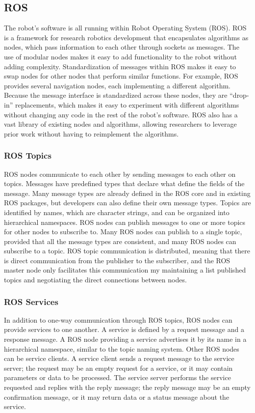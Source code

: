 \documentclass{cwru}
\begin{document}
\subsection{ROS}
The robot{\textquoteright}s software is all running within Robot Operating System (ROS). ROS is a framework for research robotics development that encapsulates algorithms as nodes, which pass information to each other through sockets as messages. The use of modular nodes makes it easy to add functionality to the robot without adding complexity. Standardization of messages within ROS makes it easy to swap nodes for other nodes that perform similar functions. For example, ROS provides several navigation nodes, each implementing a different algorithm. Because the message interface is standardized across these nodes, they are {\textquotedblleft}drop-in{\textquotedblright} replacements, which makes it easy to experiment with different algorithms without changing any code in the rest of the robot{\textquoteright}s software. ROS also has a vast library of existing nodes and algorithms, allowing researchers to leverage prior work without having to reimplement the algorithms.

\subsubsection[ROS Topics]{ROS Topics}
ROS nodes communicate to each other by sending messages to each other on topics. Messages have predefined types that declare what define the fields of the message. Many message types are already defined in the ROS core and in existing ROS packages, but developers can also define their own message types. Topics are identified by names, which are character strings, and can be organized into hierarchical namespaces. ROS nodes can publish messages to one or more topics for other nodes to subscribe to. Many ROS nodes can publish to a single topic, provided that all the message types are consistent, and many ROS nodes can subscribe to a topic. ROS topic communication is distributed, meaning that there is direct communication from the publisher to the subscriber, and the ROS master node only facilitates this communication my maintaining a list published topics and negotiating the direct connections between nodes.\cite{ros-pub-sub}

\subsubsection{ROS Services}
In addition to one-way communication through ROS topics, ROS nodes can provide services to one another. A service is defined by a request message and a response message. A ROS node providing a service advertises it by its name in a hierarchical namespace, similar to the topic naming system. Other ROS nodes can be service clients. A service client sends a request message to the service server; the request may be an empty request for a service, or it may contain parameters or data to be processed. The service server performs the service requested and replies with the reply message; the reply message may be an empty confirmation message, or it may return data or a status message about the service.\cite{ros-srv}
\end{document}
